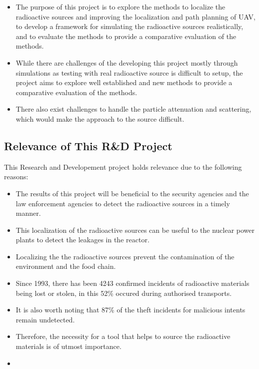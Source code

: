\documentclass[rnd]{mas_proposal}
\begin{document}
\begin{itemize}
    \item The purpose of this project is to explore the methods to localize the radioactive sources and improving the localization and path planning of UAV, to develop a framework for simulating the radioactive sources realistically, and to evaluate the methods to provide a comparative evaluation of the methods.
    \item While there are challenges of the developing this project mostly through simulations as testing with real radioactive source is difficult to setup, the project aims to explore well established and new methods to provide a comparative evaluation of the methods.
    \item There also exist challenges to handle the particle attenuation and scattering, which would make the approach to the source difficult.
\end{itemize}

\subsection{Relevance of This R\&D Project}
This Research and Developement project holds relevance due to the following reasons:
\begin{itemize}
    \item The results of this project will be beneficial to the security agencies and the law enforcement agencies to detect the radioactive sources in a timely manner.
    \item This localization of the radioactive sources can be useful to the nuclear power plants to detect the leakages in the reactor.
    \item Localizing the the radioactive sources prevent the contamination of the environment and the food chain.
    \item Since 1993, there has been 4243 confirmed incidents of radioactive materials being lost or stolen, in this 52\% occured during authorised transports. \cite{itdb_factsheet_2024}
    \item It is also worth noting that 87\% of the theft incidents for malicious intents remain undetected. \cite{itdb_factsheet_2024}
    \item Therefore, the necessity for a tool that helps to source the radioactive materials is of utmost importance.
    \item
 \end{itemize}
\end{document}
